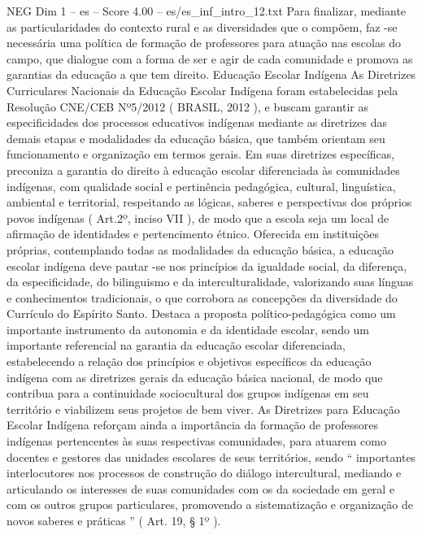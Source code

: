\begin{textsample}{NEG Dim 1 – es – Score 4.00 – es/es\_inf\_intro\_12.txt}
Para finalizar, mediante as particularidades do contexto rural e as diversidades que o compõem, faz -se necessária uma política de formação de professores para atuação nas escolas do campo, que dialogue com a forma de ser e agir de cada comunidade e promova as garantias da educação a que tem direito.
Educação Escolar Indígena As Diretrizes Curriculares Nacionais da Educação Escolar Indígena foram estabelecidas pela Resolução CNE/CEB Nº5/2012 ( BRASIL, 2012 ), e buscam garantir as especificidades dos processos educativos indígenas mediante as diretrizes das demais etapas e modalidades da educação básica, que também orientam seu funcionamento e organização em termos gerais.
Em suas diretrizes específicas, preconiza a garantia do direito à educação escolar diferenciada às comunidades indígenas, com qualidade social e pertinência pedagógica, cultural, linguística, ambiental e territorial, respeitando as lógicas, saberes e perspectivas dos próprios povos indígenas ( Art.2º, inciso VII ), de modo que a escola seja um local de afirmação de identidades e pertencimento étnico.
Oferecida em instituições próprias, contemplando todas as modalidades da educação básica, a educação escolar indígena deve pautar -se nos princípios da igualdade social, da diferença, da especificidade, do bilinguismo e da interculturalidade, valorizando suas línguas e conhecimentos tradicionais, o que corrobora as concepções da diversidade do Currículo do Espírito Santo.
Destaca a proposta político-pedagógica como um importante instrumento da autonomia e da identidade escolar, sendo um importante referencial na garantia da educação escolar diferenciada, estabelecendo a relação dos princípios e objetivos específicos da educação indígena com as diretrizes gerais da educação básica nacional, de modo que contribua para a continuidade sociocultural dos grupos indígenas em seu território e viabilizem seus projetos de bem viver.
As Diretrizes para Educação Escolar Indígena reforçam ainda a importância da formação de professores indígenas pertencentes às suas respectivas comunidades, para atuarem como docentes e gestores das unidades escolares de seus territórios, sendo “ importantes interlocutores nos processos de construção do diálogo intercultural, mediando e articulando os interesses de suas comunidades com os da sociedade em geral e com os outros grupos particulares, promovendo a sistematização e organização de novos saberes e práticas ” ( Art. 19, § 1º ).

\end{textsample}
